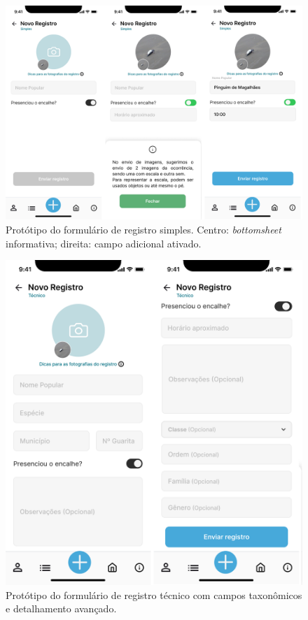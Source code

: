 \begin{figure}[H]
    \centering
    \includegraphics[height=0.55\textheight, width=\textwidth]{imagens/registro-simples-figma.png}
    \caption{Protótipo do formulário de registro simples. Centro: \textit{bottomsheet} informativa; direita: campo 
    adicional ativado.}
    \label{fig:prototipo-registro-simples}
\end{figure}

\begin{figure}[H]
    \centering
    \includegraphics[height=0.6\textheight]{imagens/registro-tecnico-figma.png}
    \caption{Protótipo do formulário de registro técnico com campos taxonômicos e detalhamento avançado.}
    \label{fig:prototipo-registro-tecnico}
\end{figure}

